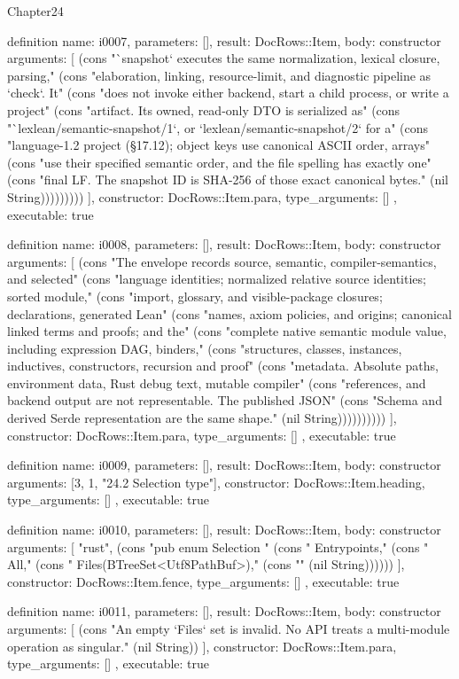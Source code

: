 \begin{lexlean}{Chapter24}
\begin{semanticmodule}
definition{
  name: i0007,
  parameters: [],
  result: DocRows::Item,
  body: constructor{
    arguments: [
      (cons "`snapshot` executes the same normalization, lexical closure, parsing," (cons "elaboration, linking, resource-limit, and diagnostic pipeline as `check`. It" (cons "does not invoke either backend, start a child process, or write a project" (cons "artifact. Its owned, read-only DTO is serialized as" (cons "`lexlean/semantic-snapshot/1`, or `lexlean/semantic-snapshot/2` for a" (cons "language-1.2 project (§17.12); object keys use canonical ASCII order, arrays" (cons "use their specified semantic order, and the file spelling has exactly one" (cons "final LF. The snapshot ID is SHA-256 of those exact canonical bytes." (nil String)))))))))
    ],
    constructor: DocRows::Item.para,
    type_arguments: []
  },
  executable: true
}

definition{
  name: i0008,
  parameters: [],
  result: DocRows::Item,
  body: constructor{
    arguments: [
      (cons "The envelope records source, semantic, compiler-semantics, and selected" (cons "language identities; normalized relative source identities; sorted module," (cons "import, glossary, and visible-package closures; declarations, generated Lean" (cons "names, axiom policies, and origins; canonical linked terms and proofs; and the" (cons "complete native semantic module value, including expression DAG, binders," (cons "structures, classes, instances, inductives, constructors, recursion and proof" (cons "metadata. Absolute paths, environment data, Rust debug text, mutable compiler" (cons "references, and backend output are not representable. The published JSON" (cons "Schema and derived Serde representation are the same shape." (nil String))))))))))
    ],
    constructor: DocRows::Item.para,
    type_arguments: []
  },
  executable: true
}

definition{
  name: i0009,
  parameters: [],
  result: DocRows::Item,
  body: constructor{
    arguments: [3, 1, "24.2 Selection type"],
    constructor: DocRows::Item.heading,
    type_arguments: []
  },
  executable: true
}

definition{
  name: i0010,
  parameters: [],
  result: DocRows::Item,
  body: constructor{
    arguments: [
      "rust",
      (cons "pub enum Selection {" (cons "    Entrypoints," (cons "    All," (cons "    Files(BTreeSet<Utf8PathBuf>)," (cons "}" (nil String))))))
    ],
    constructor: DocRows::Item.fence,
    type_arguments: []
  },
  executable: true
}

definition{
  name: i0011,
  parameters: [],
  result: DocRows::Item,
  body: constructor{
    arguments: [
      (cons "An empty `Files` set is invalid. No API treats a multi-module operation as singular." (nil String))
    ],
    constructor: DocRows::Item.para,
    type_arguments: []
  },
  executable: true
}


\end{semanticmodule}
\end{lexlean}
